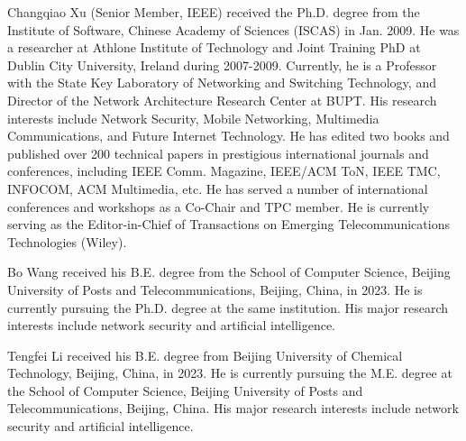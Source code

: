 \documentclass[lettersize,journal]{IEEEtran}
\begin{document}
\vspace{11pt}

\begin{IEEEbiography}{Changqiao Xu}
(Senior Member, IEEE) received the Ph.D. degree from the Institute of Software, Chinese Academy of Sciences (ISCAS) in Jan. 2009. He was a researcher at Athlone Institute of Technology and Joint Training PhD at Dublin City University, Ireland during 2007-2009. %
Currently, he is a Professor with the State Key Laboratory of Networking and Switching Technology, and Director of the Network Architecture Research Center at BUPT. His research interests include Network Security, Mobile Networking, Multimedia Communications, and Future Internet Technology. He has edited two books and published over 200 technical papers in prestigious international journals and conferences, including IEEE Comm. Magazine, IEEE/ACM ToN, IEEE TMC, INFOCOM, ACM Multimedia, etc. He has served a number of international conferences and workshops as a Co-Chair and TPC member. He is currently serving as the Editor-in-Chief of Transactions on Emerging Telecommunications Technologies (Wiley).
\end{IEEEbiography}

\vspace{11pt}

\begin{IEEEbiography}{Bo Wang} received his B.E. degree from the School of Computer Science, Beijing University of Posts and Telecommunications, Beijing, China, in 2023. He is currently pursuing the Ph.D. degree at the same institution. His major research interests include network security and artificial intelligence.
\end{IEEEbiography}

\vspace{11pt}

\begin{IEEEbiography}{Tengfei Li} received his B.E. degree from Beijing University of Chemical Technology, Beijing, China, in 2023. He is currently pursuing the M.E. degree at the School of Computer Science, Beijing University of Posts and Telecommunications, Beijing, China. His major research interests include network security and artificial intelligence.
\end{IEEEbiography}
\end{document}
